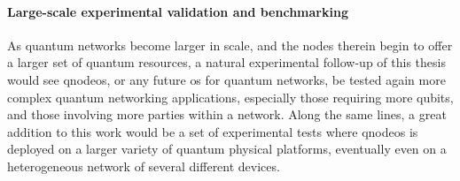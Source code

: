 \paragraph{Large-scale experimental validation and benchmarking}

As quantum networks become larger in scale, and the nodes therein begin to offer a larger set of
quantum resources, a natural experimental follow-up of this thesis would see \acrshort{qnodeos}, or
any future \acrshort{os} for quantum networks, be tested again more complex quantum networking
applications, especially those requiring more qubits, and those involving more parties within a
network. Along the same lines, a great addition to this work would be a set of experimental tests
where \acrshort{qnodeos} is deployed on a larger variety of quantum physical platforms, eventually
even on a heterogeneous network of several different devices.

\printbibliography[heading=subbibintoc,title={References},notcategory=noprint]
